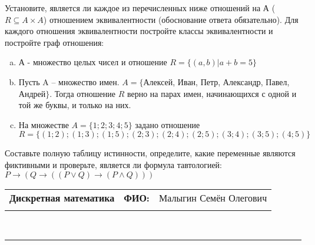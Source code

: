 \documentclass[10pt]{exam}
\newcommand{\class}{Дискретная математика}
\newcommand{\examdate}{}
\begin{document}
\begin{questions}
\question
Установите, является ли каждое из перечисленных ниже отношений на А ($R \subseteq A \times A$) отношением эквивалентности (обоснование ответа обязательно). Для каждого отношения эквивалентности постройте классы 
эквивалентности и постройте граф отношения:
\begin{enumerate} [a)]\setcounter{enumi}{0}
\item А - множество целых чисел и отношение $R = \{(a,b)|a + b = 5\}$
\item Пусть A – множество имен. $A = \{ $Алексей, Иван, Петр, Александр, Павел, Андрей$ \}$. Тогда отношение $R $ верно на парах имен, начинающихся с одной и той же буквы, и только на них.
\item На множестве $A = \{1; 2; 3; 4; 5\}$ задано отношение $R = \{(1; 2); (1; 3); (1; 5); (2; 3); (2; 4); (2; 5); (3; 4); (3; 5); (4; 5)\}$
\end{enumerate}\question Составьте полную таблицу истинности, определите, какие переменные являются фиктивными и проверьте, является ли формула тавтологией:
$ P \rightarrow (Q \rightarrow ((P \lor Q) \rightarrow (P \land Q)))$

\end{questions}
\newpage
\begin{flushright}
\begin{tabular}{p{2.8in} r l}
\textbf{\class} & \textbf{ФИО:} &Малыгин Семён Олегович
\\

\textbf{\examdate} &&\\
\end{tabular}\\
\end{flushright}
\rule[1ex]{\textwidth}{.1pt}
\end{document}
